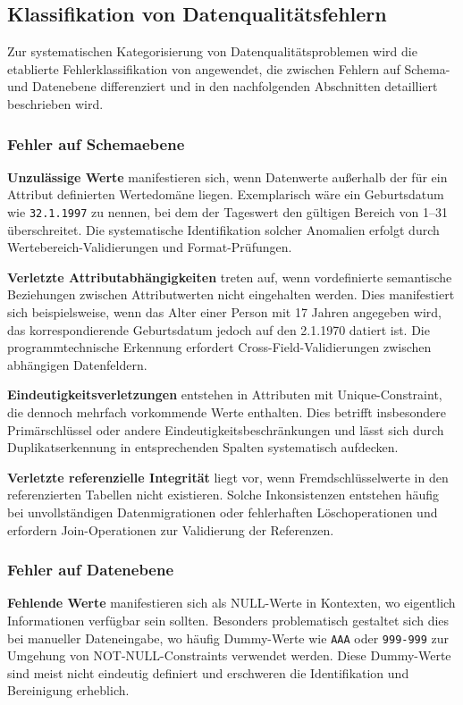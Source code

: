 \documentclass[
    a4paper,
    12pt,
    headinclude=true,
    BCOR=10mm,
]{scrreprt}
\begin{document}
\subsection{Klassifikation von Datenqualitätsfehlern}
Zur systematischen Kategorisierung von Datenqualitätsproblemen wird die etablierte Fehlerklassifikation von \cite{leser2007informationsintegration} angewendet, die zwischen Fehlern auf Schema- und Datenebene differenziert und in den nachfolgenden Abschnitten detailliert beschrieben wird.

\subsubsection{Fehler auf Schemaebene}
\textbf{Unzulässige Werte} manifestieren sich, wenn Datenwerte außerhalb der für ein Attribut definierten Wertedomäne liegen. Exemplarisch wäre ein Geburtsdatum wie \texttt{32.1.1997} zu nennen, bei dem der Tageswert den gültigen Bereich von 1--31 überschreitet. Die systematische Identifikation solcher Anomalien erfolgt durch Wertebereich-Validierungen und Format-Prüfungen.

\textbf{Verletzte Attributabhängigkeiten} treten auf, wenn vordefinierte semantische Beziehungen zwischen Attributwerten nicht eingehalten werden. Dies manifestiert sich beispielsweise, wenn das Alter einer Person mit 17 Jahren angegeben wird, das korrespondierende Geburtsdatum jedoch auf den 2.1.1970 datiert ist. Die programmtechnische Erkennung erfordert Cross-Field-Validierungen zwischen abhängigen Datenfeldern.

\textbf{Eindeutigkeitsverletzungen} entstehen in Attributen mit Unique-Constraint, die dennoch mehrfach vorkommende Werte enthalten. Dies betrifft insbesondere Primärschlüssel oder andere Eindeutigkeitsbeschränkungen und lässt sich durch Duplikatserkennung in entsprechenden Spalten systematisch aufdecken.

\textbf{Verletzte referenzielle Integrität} liegt vor, wenn Fremdschlüsselwerte in den referenzierten Tabellen nicht existieren. Solche Inkonsistenzen entstehen häufig bei unvollständigen Datenmigrationen oder fehlerhaften Löschoperationen und erfordern Join-Operationen zur Validierung der Referenzen.

\subsubsection{Fehler auf Datenebene}

\textbf{Fehlende Werte} manifestieren sich als NULL-Werte in Kontexten, wo eigentlich Informationen verfügbar sein sollten. Besonders problematisch gestaltet sich dies bei manueller Dateneingabe, wo häufig Dummy-Werte wie \texttt{AAA} oder \texttt{999-999} zur Umgehung von NOT-NULL-Constraints verwendet werden. Diese Dummy-Werte sind meist nicht eindeutig definiert und erschweren die Identifikation und Bereinigung erheblich.
\end{document}
